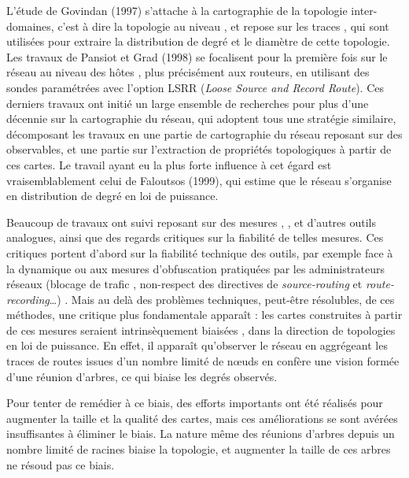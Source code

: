 L'étude de Govindan \etal\cite{govindan1997analysis} (1997) s'attache à la
cartographie de la topologie inter-domaines, c'est à dire la topologie au niveau
\as, et repose sur les traces \bgp, qui sont utilisées pour extraire la
distribution de degré et le diamètre de cette topologie. Les travaux de Pansiot
et Grad\cite{280555} (1998) se focalisent pour la première fois sur
le réseau au niveau des hôtes \LLL, plus précisément aux routeurs, en utilisant
des sondes \traceroute paramétrées avec l'option LSRR ({\em Loose Source and
Record Route}). Ces derniers travaux ont initié un large ensemble de recherches
pour plus d'une décennie sur la cartographie du réseau, qui adoptent tous une
stratégie similaire, décomposant les travaux en une partie de cartographie du
réseau reposant sur des observables, et une partie sur l'extraction de
propriétés topologiques à partir de ces cartes. Le travail ayant eu la plus
forte influence à cet égard est vraisemblablement celui de
Faloutsos\etal\cite{faloutsos1999power} (1999), qui estime que le réseau
s'organise en distribution de degré en loi de puissance.

Beaucoup de travaux ont suivi reposant sur des mesures \traceroute,
\tracetree\cite{sarac2004tracetree,latapy2008radar}, \mrinfo\cite{merlin} et
d'autres outils analogues, ainsi que des regards critiques sur la fiabilité de
telles mesures. Ces critiques portent d'abord sur la fiabilité technique des
outils, par exemple face à la dynamique ou aux mesures d'obfuscation pratiquées
par les administrateurs réseaux (blocage de trafic \icmp, non-respect des
directives de {\em source-routing} et {\em route-recording}\ldots)
\cite{GunesS09,paristraceroute,keys2010internet,keysiffinder,roughan201110,pansiot2012,alias-bias}.
Mais au delà des problèmes techniques, peut-être résolubles, de ces méthodes,
une critique plus fondamentale apparaît :
les cartes construites à partir de ces mesures seraient intrinsèquement biaisées
\cite{roughan201110,willinger,LakhinaBCX03,AchlioptasCKM09,DallAstaABVV06,GuillaumeL05,GuillaumeLM06,LatapyM08,MDBP10},
dans la direction de topologies en loi de puissance. En effet, il apparaît
qu'observer le réseau en aggrégeant les traces de routes issues d'un nombre
limité de n\oe{}uds en confère une vision formée d'une réunion d'arbres, ce qui
biaise les degrés observés.

Pour tenter de remédier à ce biais, des efforts importants ont été réalisés pour
augmenter la taille et la qualité des cartes, mais ces améliorations se sont
avérées insuffisantes à éliminer le
biais\cite{willinger,LatapyM08,BarfordBBC01}. La nature même des
réunions d'arbres depuis un nombre limité de racines biaise la topologie, et
augmenter la taille de ces arbres ne résoud pas ce biais.

